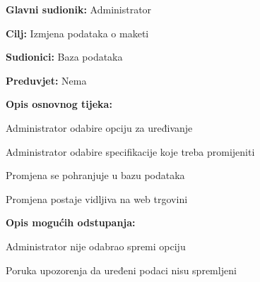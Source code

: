 					
					\noindent {}
					\begin{packed_item}
						
						\item \textbf{Glavni sudionik: } Administrator
						\item  \textbf{Cilj:} Izmjena podataka o maketi
						\item  \textbf{Sudionici:} Baza podataka
						\item  \textbf{Preduvjet:} Nema
						\item  \textbf{Opis osnovnog tijeka:}
						
						\item[] \begin{packed_enum}
							
							\item Administrator odabire opciju za uređivanje
							\item Administrator odabire specifikacije koje treba promijeniti
							\item Promjena se pohranjuje u bazu podataka
							\item Promjena postaje vidljiva na web trgovini
						\end{packed_enum}
						\item  \textbf{Opis mogućih odstupanja:}
						
						\item[] \begin{packed_item}
							
							\item[2.a] Administrator nije odabrao spremi opciju
							
							\item[] \begin{packed_enum}
								
								\item Poruka upozorenja da uređeni podaci nisu spremljeni
								
							\end{packed_enum}
							
						\end{packed_item}
					\end{packed_item}
				

